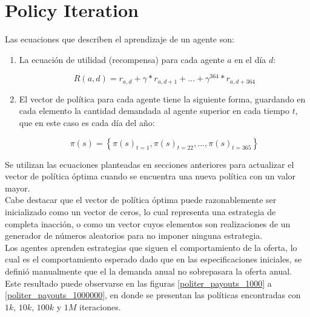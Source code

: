 \section{Policy Iteration}

Las ecuaciones que describen el aprendizaje de un agente son:

\begin{enumerate}
    \item La ecuaci\'on de utilidad (recompensa) para cada agente $a$ en el d\'ia $d$:

$$
R(a, d) = r_{a,d} + \gamma*r_{a, d+1} + ... + \gamma^{364}*r_{a,d+364}
$$

    \item El vector de pol\'itica para cada agente tiene la siguiente forma, guardando en cada elemento la cantidad demandada al agente superior en cada tiempo $t$, que en este caso es cada d\'ia del a\~no:
    
$$
\pi(s) = \left \{ \pi(s)_{ t = 1}, \pi(s)_{ t = 22}, ..., \pi(s)_{ t = 365} \right \}
$$

\end{enumerate}

Se utilizan las ecuaciones planteadas en secciones anteriores para actualizar el vector de pol\'itica \'optima cuando se encuentra una nueva pol\'itica con un valor mayor.\\

Cabe destacar que el vector de pol\'itica \'optima puede razonablemente ser inicializado como un vector de ceros, lo cual representa una estrategia de completa inacci\'on, o como un vector cuyos elementos son realizaciones de un generador de n\'umeros aleatorios para no imponer ninguna estrategia.\\

Los agentes aprenden estrategias que siguen el comportamiento de la oferta, lo cual es el comportamiento esperado dado que en las especificaciones iniciales, se defini\'o manualmente que el la demanda anual no sobrepasara la oferta anual. Este resultado puede observarse en las figuras \ref{politer_payouts_1000} a \ref{politer_payouts_1000000}, en donde se presentan las pol\'iticas encontradas con $1k$, $10k$, $100k$ y $1M$ iteraciones. \\

